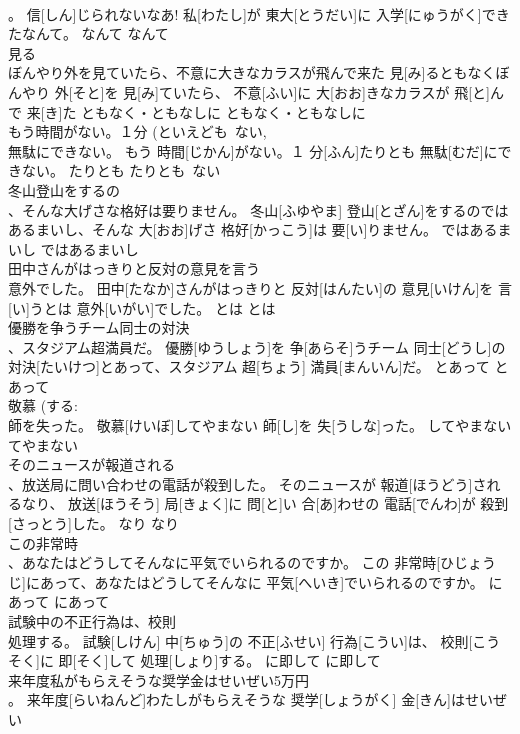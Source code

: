 \documentclass[8pt]{extreport}
\begin{document}
\begin{CJK}{UTF8}{min}
\\	。	信[しん]じられないなあ! 私[わたし]が 東大[とうだい]に 入学[にゅうがく]できたなんて。	なんて	なんて	
\\	見る 
\\	ぼんやり外を見ていたら、不意に大きなカラスが飛んで来た	見[み]るともなくぼんやり 外[そと]を 見[み]ていたら、 不意[ふい]に 大[おお]きなカラスが 飛[と]んで 来[き]た	ともなく・ともなしに	ともなく・ともなしに	
\\	もう時間がない。１分 (といえども~ない, 
\\	無駄にできない。	もう 時間[じかん]がない。１ 分[ふん]たりとも 無駄[むだ]にできない。	たりとも	たりとも~ない	
\\	冬山登山をするの 
\\	、そんな大げさな格好は要りません。	冬山[ふゆやま] 登山[とざん]をするのではあるまいし、そんな 大[おお]げさ 格好[かっこう]は 要[い]りません。	ではあるまいし	ではあるまいし	
\\	田中さんがはっきりと反対の意見を言う 
\\	意外でした。	田中[たなか]さんがはっきりと 反対[はんたい]の 意見[いけん]を 言[い]うとは 意外[いがい]でした。	とは	とは	
\\	優勝を争うチーム同士の対決 
\\	、スタジアム超満員だ。	優勝[ゆうしょう]を 争[あらそ]うチーム 同士[どうし]の 対決[たいけつ]とあって、スタジアム 超[ちょう] 満員[まんいん]だ。	とあって	とあって	
\\	敬慕 (する: 
\\	師を失った。	敬慕[けいぼ]してやまない 師[し]を 失[うしな]った。	してやまない	てやまない	
\\	そのニュースが報道される 
\\	、放送局に問い合わせの電話が殺到した。	そのニュースが 報道[ほうどう]されるなり、 放送[ほうそう] 局[きょく]に 問[と]い 合[あ]わせの 電話[でんわ]が 殺到[さっとう]した。	なり	なり	
\\	この非常時 
\\	、あなたはどうしてそんなに平気でいられるのですか。	この 非常時[ひじょうじ]にあって、あなたはどうしてそんなに 平気[へいき]でいられるのですか。	にあって	にあって	
\\	試験中の不正行為は、校則 
\\	処理する。	試験[しけん] 中[ちゅう]の 不正[ふせい] 行為[こうい]は、 校則[こうそく]に 即[そく]して 処理[しょり]する。	に即して	に即して	
\\	来年度私がもらえそうな奨学金はせいぜい5万円 
\\	。	来年度[らいねんど]わたしがもらえそうな 奨学[しょうがく] 金[きん]はせいぜい 

\end{CJK}
\end{document}

